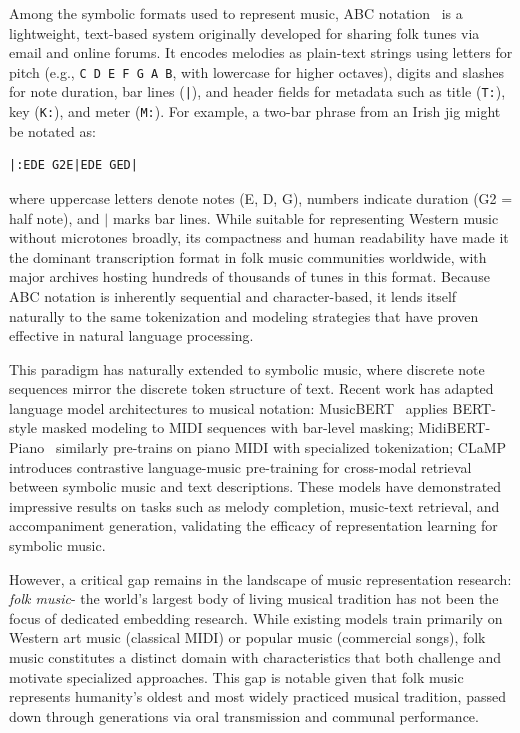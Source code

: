 \documentclass[]{interact}
\theoremstyle{plain}
\theoremstyle{definition}
\theoremstyle{remark}
\begin{document}
Among the symbolic formats used to represent music, ABC notation~\cite{ABCNotation2011} is a lightweight, text-based system originally developed for sharing folk tunes via email and online forums. It encodes melodies as plain-text strings using letters for pitch (e.g., \texttt{C D E F G A B}, with lowercase for higher octaves), digits and slashes for note duration, bar lines (\texttt{|}), and header fields for metadata such as title (\texttt{T:}), key (\texttt{K:}), and meter (\texttt{M:}). For example, a two-bar phrase from an Irish jig might be notated as:
\begin{verbatim}
|:EDE G2E|EDE GED|
\end{verbatim}
where uppercase letters denote notes (E, D, G), numbers indicate duration (G2 = half note), and $|$ marks bar lines. While suitable for representing Western music without microtones broadly, its compactness and human readability have made it the dominant transcription format in folk music communities worldwide, with major archives hosting hundreds of thousands of tunes in this format. Because ABC notation is inherently sequential and character-based, it lends itself naturally to the same tokenization and modeling strategies that have proven effective in natural language processing.

This paradigm has naturally extended to symbolic music, where discrete note sequences mirror the discrete token structure of text. Recent work has adapted language model architectures to musical notation: MusicBERT~\cite{MusicBERT2022} applies BERT-style masked modeling to MIDI sequences with bar-level masking; MidiBERT-Piano~\cite{MidiBERT2021} similarly pre-trains on piano MIDI with specialized tokenization; CLaMP~\cite{CLaMP2023} introduces contrastive language-music pre-training for cross-modal retrieval between symbolic music and text descriptions. These models have demonstrated impressive results on tasks such as melody completion, music-text retrieval, and accompaniment generation, validating the efficacy of representation learning for symbolic music.

However, a critical gap remains in the landscape of music representation research: \textit{folk music}- the world's largest body of living musical tradition has not been the focus of dedicated embedding research. While existing models train primarily on Western art music (classical MIDI) or popular music (commercial songs), folk music constitutes a distinct domain with characteristics that both challenge and motivate specialized approaches. This gap is notable given that folk music represents humanity's oldest and most widely practiced musical tradition, passed down through generations via oral transmission and communal performance.
\end{document}
